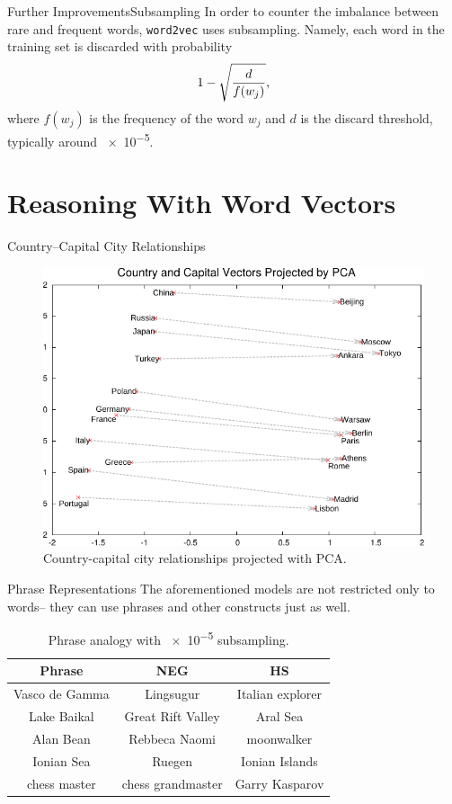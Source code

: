 \documentclass[usepdftitle=false]{beamer}
\theoremstyle{definition}
\begin{document}
\begin{frame}{Further Improvements}{Subsampling}
  In order to counter the imbalance between rare and frequent words,
  \Verb+word2vec+ uses subsampling.  Namely, each word in the training
  set is discarded with probability
  \[
    1 - \sqrt{\frac{d}{f(w_j)}}\text,
  \]
  where \(f(w_j)\) is the frequency of the word \(w_j\) and \(d\) is
  the discard threshold, typically around \num{e-5}.
\end{frame}

\section{Reasoning With Word Vectors}

\begin{frame}{Country--Capital City Relationships}
  \begin{figure}
    \centering
    \includegraphics[width=.75\textwidth]{Country--Capital_Vectors.pdf}
    \caption{Country\--capital city relationships projected with PCA.}
  \end{figure}  
\end{frame}

\begin{frame}{Phrase Representations}
  The aforementioned models are not restricted only to words\--- they
  can use phrases and other constructs just as well.
  \begin{table}
    \centering
    \caption{Phrase analogy with \num{e-5} subsampling.}
    \begin{tabular}{c c c}
      \toprule
      Phrase & NEG & HS\\
      \midrule
      Vasco de Gamma & Lingsugur & Italian explorer\\
      Lake Baikal & Great Rift Valley & Aral Sea\\
      Alan Bean & Rebbeca Naomi & moonwalker\\
      Ionian Sea & Ruegen & Ionian Islands\\
      chess master & chess grandmaster & Garry Kasparov\\
      \bottomrule
    \end{tabular}
  \end{table}
\end{frame}
\end{document}
